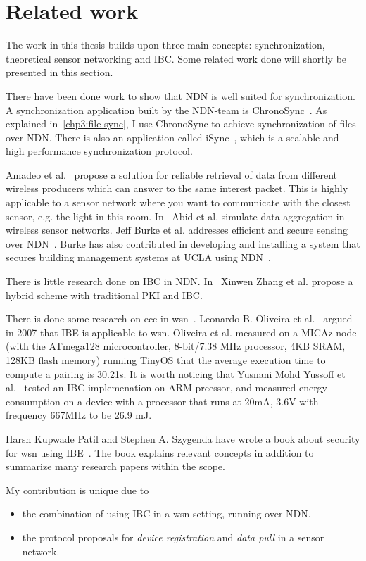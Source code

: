 \section{Related work}
The work in this thesis builds upon three main concepts: synchronization, theoretical sensor networking and \gls{IBC}. 
Some related work done will shortly be presented in this section.

There have been done work to show that \gls{NDN} is well suited for synchronization. 
A synchronization application built by the \gls{NDN}-team is ChronoSync~\cite{DBLP:conf/icnp/ZhuA13}.
As explained in~\autoref{chp3:file-sync}, I use ChronoSync to achieve synchronization of files over \gls{NDN}.
There is also an application called iSync~\cite{DBLP:conf/acmicn/FuAC14}, which is a scalable and high performance synchronization protocol.

Amadeo et al.~\cite{DBLP:conf/acmicn/AmadeoCM14} propose a solution for reliable retrieval of \gls{data} from different wireless producers which can answer to the same \gls{interest} packet. This is highly applicable to a sensor network where you want to communicate with the closest sensor, e.g. the light in this room.
In~\cite{DBLP:conf/noms/AbidySLF14} Abid et al. simulate \gls{data} aggregation in wireless sensor networks.
Jeff Burke et al. addresses efficient and secure sensing over \gls{NDN}~\cite{DBLP:conf/nca/BurkeGNT14}.
Burke has also contributed in developing and installing a system that secures building management systems at \gls{UCLA} using \gls{NDN}~\cite{DBLP:journals/network/ShangDMBZ14}.

There is little research done on \gls{IBC} in \gls{NDN}. 
In~\cite{DBLP:conf/icnp/ZhangCXWSW11} Xinwen Zhang et al. propose a hybrid scheme with traditional \gls{PKI} and \gls{IBC}.

There is done some research on \gls{ecc} in \gls{wsn}~\cite{DBLP:conf/ipsn/LiuN08, DBLP:conf/ewsn/SzczechowiakOSCD08}.
Leonardo B. Oliveira et al.~\cite{DBLP:journals/iacr/OliveiraAMDLD07} argued in 2007 that \gls{IBE} is applicable to \gls{wsn}.
Oliveira et al. measured on a MICAz node (with the ATmega128 microcontroller, 8-bit/7.38 MHz processor, 4KB SRAM, 128KB flash memory) running TinyOS that the average execution time to compute a pairing is 30.21s. 
It is worth noticing that Yusnani Mohd Yussoff et al.~\cite{DBLP:journals/corr/abs-1207-6185} tested an \gls{IBC} implemenation on ARM prcessor, and measured energy consumption on a device with a processor that runs at 20mA, 3.6V with frequency 667MHz to be 26.9 mJ.

Harsh Kupwade Patil and Stephen A. Szygenda have wrote a book about security for \gls{wsn} using \gls{IBE}~\cite{Patil:2012:SWS:2464778}.
The book explains relevant concepts in addition to summarize many research papers within the scope.

My contribution is unique due to 
\begin{itemize}
  \item the combination of using \gls{IBC} in a \gls{wsn} setting, running over \gls{NDN}.
  \item the protocol proposals for \textit{device registration} and \textit{data pull} in a sensor network.
\end{itemize}